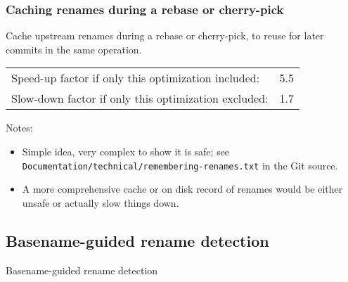 \documentclass[compress,t]{beamer}
\begin{document}
\begin{frame}
  \frametitle{Caching renames during a rebase or cherry-pick}

  Cache upstream renames during a rebase or cherry-pick, to reuse for
  later commits in the same operation.

  \pause
  \vspace*{\baselineskip}
  \begin{tabular}{lr}
    Speed-up factor if only this optimization included:  & 5.5 \\
    Slow-down factor if only this optimization excluded: & 1.7
  \end{tabular}

  \pause
  \vspace*{2\baselineskip}
  {\scriptsize
  Notes:
  \begin{itemize}[<+(1)->]
    \item Simple idea, very complex to show it is safe;
          see \texttt{Documentation/technical/remembering-renames.txt} in
          the Git source.
    \item A more comprehensive cache or on disk record of renames would be
          either unsafe or actually slow things down.
  \end{itemize}
  }

\end{frame}

\subsection[Basenames]{Basename-guided rename detection}

\begin{frame}
  \vfill
  \vspace*{2\baselineskip}
  {\Huge
  \begin{center}Basename-guided rename detection\end{center}
  }
  \vfill
\end{frame}

\end{document}
